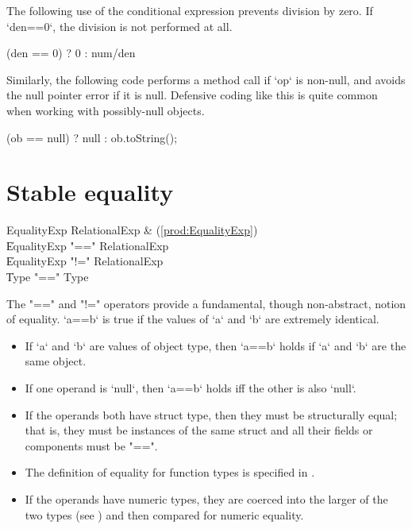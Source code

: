 \begin{ex}
The following use of the conditional expression prevents division by zero.  If
\xcd`den==0`, the division is not performed at all.
\begin{xten}
(den == 0) ? 0 : num/den
\end{xten}

Similarly, the following code performs a method call if \xcd`op` is non-null,
and avoids the null pointer error if it is null.  Defensive coding like this
is quite common when working with possibly-null objects.
\begin{xten}
(ob == null) ? null : ob.toString();
\end{xten}



\end{ex}

\section{Stable equality}
\label{StableEquality}
\index{\Xcd{==}}

\begin{bbgrammar}
 EqualityExp    \: RelationalExp & (\ref{prod:EqualityExp})\\%
    \| EqualityExp \xcd"==" RelationalExp\\
    \| EqualityExp \xcd"!=" RelationalExp\\
    \| Type  \xcd"==" Type \\
\end{bbgrammar}


The \xcd"==" and \xcd"!=" operators provide a fundamental, though
non-abstract, notion of equality.  \xcd`a==b` is true if the values of \xcd`a`
and \xcd`b` are extremely identical.

\begin{itemize}
\item If \xcd`a` and \xcd`b` are values of object type, then \xcd`a==b` holds
      if \xcd`a` and \xcd`b` are the same object.
\item If one operand is \xcd`null`, then \xcd`a==b` holds iff the other is
      also \xcd`null`.
\item If the operands both have struct type, then they must be structurally equal;
that is, they must be instances of the same struct
and all their fields or components must be \xcd"==". 
\item The definition of equality for function types is specified in
      .
\item If the operands have numeric types, they are coerced into the larger of
      the two types (see ) and then compared for numeric equality.
\end{itemize}

